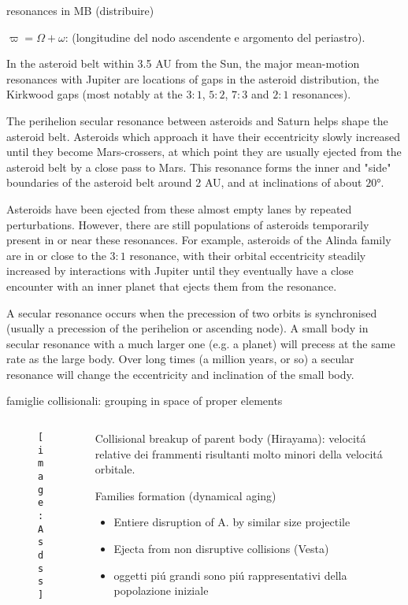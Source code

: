 \begin{wordonframe}{resonances in MB (distribuire)}

$\varpi=\Omega+\omega$: (longitudine del nodo ascendente e argomento del periastro).

In the asteroid belt within 3.5 AU from the Sun, the major mean-motion resonances with Jupiter are locations of gaps in the asteroid distribution, the Kirkwood gaps (most notably at the $3:1$, $5:2$, $7:3$ and $2:1$ resonances).

The perihelion secular resonance between asteroids and Saturn  helps shape the asteroid belt. Asteroids which approach it have their eccentricity slowly increased until they become Mars-crossers, at which point they are usually ejected from the asteroid belt by a close pass to Mars. This resonance forms the inner and "side" boundaries of the asteroid belt around 2 AU, and at inclinations of about $\ang{20}$.

Asteroids have been ejected from these almost empty lanes by repeated perturbations. However, there are still populations of asteroids temporarily present in or near these resonances. For example, asteroids of the Alinda family are in or close to the $3:1$ resonance, with their orbital eccentricity steadily increased by interactions with Jupiter until they eventually have a close encounter with an inner planet that ejects them from the resonance.

A secular resonance occurs when the precession of two orbits is synchronised (usually a precession of the perihelion or ascending node). A small body in secular resonance with a much larger one (e.g. a planet) will precess at the same rate as the large body. Over long times (a million years, or so) a secular resonance will change the eccentricity and inclination of the small body.
\end{wordonframe}

\begin{frame}{famiglie collisionali: grouping in space of proper elements}
\begin{columns}[T]
\begin{column}{0.65\textwidth}
\begin{figure}[!ht]
\texttt{[image: Asdss]}
\end{figure}
\end{column}
\begin{column}{0.35\textwidth}
Collisional breakup of parent body (Hirayama): velocit\'a relative dei frammenti risultanti molto minori della velocit\'a orbitale.
\begin{block}{Families formation (dynamical aging)}
\begin{itemize}\item Entiere disruption of A. by similar size projectile \item Ejecta from non disruptive collisions (Vesta)
\item oggetti pi\'u grandi sono pi\'u rappresentativi della popolazione iniziale
\end{itemize}
\end{block}
\end{column}
\end{columns}
\end{frame}

